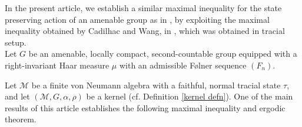 \documentclass[11pt]{amsart}
\theoremstyle{definition}
\theoremstyle{myremark}
\numberwithin{equation}{section}
\begin{document}
In the present article, we establish a similar maximal inequality for the state preserving action of an amenable group as in \cite{Bik-Dip-Amenable}, by exploiting the maximal inequality obtained by  Cadilhac and Wang, in \cite{cadilhac2022noncommutative}, which was obtained in tracial setup.\\

Let \( G \) be an amenable, locally compact, second-countable group equipped with a right-invariant Haar measure \( \mu \) with an admissible F\o lner sequence $(F_n)$. 

Let \( \mathcal{M} \) be a finite von Neumann algebra with a faithful, normal tracial state \( \tau \), and let \( (\mathcal{M}, G, \alpha, \rho) \) be a kernel (cf.  Definition \ref{kernel defn}). One of the main results of this article establishes the following maximal inequality and ergodic theorem.
\end{document}
